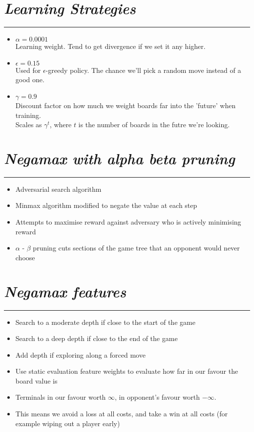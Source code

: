 \documentclass[10pt]{report}
\begin{document}
\section*{\emph{\textmd{Learning Strategies}}}
\hrule
\begin{itemize}
	\item $\alpha = 0.0001$
		\\ Learning weight. Tend to get divergence if we set it any higher.
	
	\item $\epsilon = 0.15$
		\\ Used for $\epsilon$-greedy policy. The chance we'll pick a random move instead of a good one.
	\item $\gamma = 0.9$
		\\ Discount factor on how much we weight boards far into the 'future' when training.
		\\ Scales as $\gamma^t$, where $t$ is the number of boards in the futre we're looking.
	\end{itemize}

\section*{\emph{Negamax with alpha beta pruning}}
\hrule
    \begin{itemize}
  \item
    Adversarial search algorithm
  \item
    Minmax algorithm modified to negate the value at each step
  \item
    Attempts to maximise reward against adversary who is actively minimising reward
  \item
   $\alpha$ - $\beta$ pruning cuts sections of the game tree that an opponent would never choose
  \end{itemize}

\section*{\emph{\textmd{Negamax features}}}
\hrule
    \begin{itemize}
  \item
    Search to a moderate depth if close to the start of the game
  \item
    Search to a deep depth if close to the end of the game
  \item
    Add depth if exploring along a forced move
  \item
    Use static evaluation feature weights to evaluate how far in our favour the board value is
  \item
    Terminals in our favour worth $\infty$, in opponent's favour worth $-\infty$.
  \item
    This means we avoid a loss at all costs, and take a win at all costs (for example wiping out a player early)
  \end{itemize}
\end{document}
